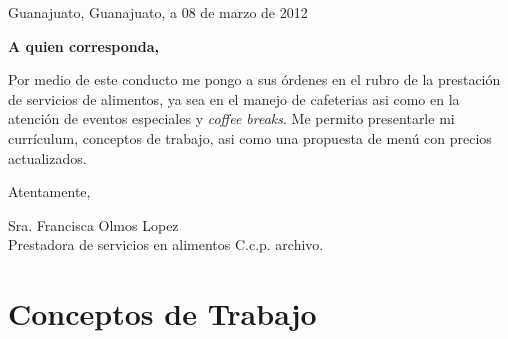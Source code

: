 \documentclass[12pt]{article}
\begin{document}
\thispagestyle{empty}
\hfill{Guanajuato, Guanajuato, a 08 de marzo de 2012}\vspace{35pt}


\textbf{A quien corresponda,}
\vspace{6em}

Por medio de este conducto me pongo a sus órdenes en el rubro de la prestación de servicios de alimentos,‭ ‬ya sea en el manejo de cafeterias asi como en la atención de eventos especiales y \emph{coffee breaks}‭.‭ Me permito presentarle mi currículum‭‬,‭ conceptos de trabajo‭, asi como una propuesta de menú con precios actualizados.\vspace{75pt}

Atentamente,\vspace{75pt}


Sra.‭ ‬Francisca Olmos Lopez\\
Prestadora de servicios en alimentos
\vfill
\hfill C.c.p.‭ ‬archivo.‭    
\newpage

\section{Conceptos de Trabajo‭}
\end{document}
